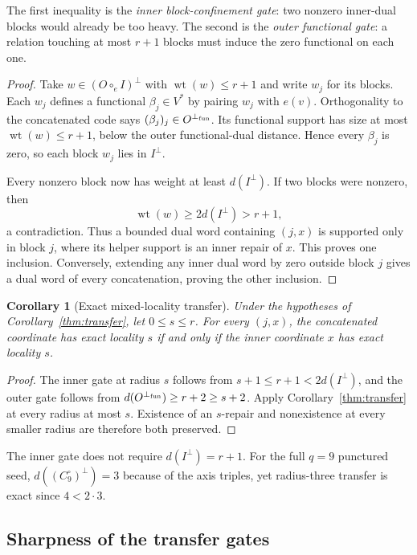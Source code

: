 \documentclass[11pt]{article}
\newtheorem{corollary}[theorem]{Corollary}
\theoremstyle{definition}
\theoremstyle{remark}
\newcommand{\wt}{\operatorname{wt}}
\begin{document}
The first inequality is the \emph{inner block-confinement gate}: two nonzero
inner-dual blocks would already be too heavy.  The second is the
\emph{outer functional gate}: a relation touching at most $r+1$ blocks must
induce the zero functional on each one.

\begin{proof}
Take $w\in(O\circ_e I)^\perp$ with $\wt(w)\leq r+1$ and write $w_j$ for
its blocks.  Each $w_j$ defines a functional $\beta_j\in V^*$ by pairing
$w_j$ with $e(v)$.  Orthogonality to the concatenated code says
$(\beta_j)_j\in O^{\perp_{\rm fun}}$.  Its functional support has size at
most $\wt(w)\leq r+1$, below the outer functional-dual distance.  Hence
every $\beta_j$ is zero, so each block $w_j$ lies in $I^\perp$.

Every nonzero block now has weight at least $d(I^\perp)$.  If two blocks
were nonzero, then
\[
 \wt(w)\geq2d(I^\perp)>r+1,
\]
a contradiction.  Thus a bounded dual word containing $(j,x)$ is supported
only in block $j$, where its helper support is an inner repair of $x$.  This
proves one inclusion.  Conversely, extending any inner dual word by zero
outside block $j$ gives a dual word of every concatenation, proving the
other inclusion.
\end{proof}

\begin{corollary}[Exact mixed-locality transfer]\label{cor:exact-locality-transfer}
Under the hypotheses of Corollary~\ref{thm:transfer}, let $0\leq s\leq r$.
For every $(j,x)$, the concatenated coordinate has exact locality $s$ if
and only if the inner coordinate $x$ has exact locality $s$.
\end{corollary}

\begin{proof}
The inner gate at radius $s$ follows from $s+1\leq r+1<2d(I^\perp)$, and
the outer gate follows from $d(O^{\perp_{\rm fun}})\geq r+2\geq s+2$.
Apply Corollary~\ref{thm:transfer} at every radius at most $s$.  Existence of
an $s$-repair and nonexistence at every smaller radius are therefore both
preserved.
\end{proof}

The inner gate does not require
$d(I^\perp)=r+1$.  For the full $q=9$ punctured seed, $d((C_9^\circ)^\perp)=3$ because of
the axis triples, yet radius-three transfer is exact since $4<2\cdot3$.

\subsection{Sharpness of the transfer gates}
\end{document}
